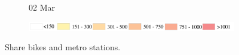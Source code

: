 \documentclass[ijgi,submit,moreauthors,pdftex]{Definitions/mdpi}
\begin{document}
\begin{figure}[H]
    \begin{subfigure}{.3\textwidth}
        \caption{02 Mar}
    \end{subfigure}

    \vspace{6pt}
    \begin{subfigure}{.7\textwidth}
        \includegraphics[width=\textwidth]{Figures/AppendixLegend2-eps-converted-to.pdf}
    \end{subfigure}
    \caption{Share bikes and metro stations.}
    \label{fig:BSS_metro}
\end{figure}
\end{document}

